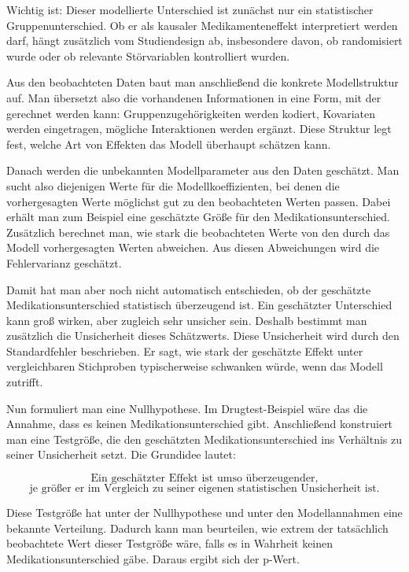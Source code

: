 \documentclass[10pt, letterpaper]{article}
\begin{document}
Wichtig ist: Dieser modellierte Unterschied ist zunächst nur ein statistischer Gruppenunterschied. Ob er als kausaler Medikamenteneffekt interpretiert werden darf, hängt zusätzlich vom Studiendesign ab, insbesondere davon, ob randomisiert wurde oder ob relevante Störvariablen kontrolliert wurden.

Aus den beobachteten Daten baut man anschließend die konkrete Modellstruktur auf. Man übersetzt also die vorhandenen Informationen in eine Form, mit der gerechnet werden kann: Gruppenzugehörigkeiten werden kodiert, Kovariaten werden eingetragen, mögliche Interaktionen werden ergänzt. Diese Struktur legt fest, welche Art von Effekten das Modell überhaupt schätzen kann.

Danach werden die unbekannten Modellparameter aus den Daten geschätzt. Man sucht also diejenigen Werte für die Modellkoeffizienten, bei denen die vorhergesagten Werte möglichst gut zu den beobachteten Werten passen. Dabei erhält man zum Beispiel eine geschätzte Größe für den Medikationsunterschied. Zusätzlich berechnet man, wie stark die beobachteten Werte von den durch das Modell vorhergesagten Werten abweichen. Aus diesen Abweichungen wird die Fehlervarianz geschätzt.

Damit hat man aber noch nicht automatisch entschieden, ob der geschätzte Medikationsunterschied statistisch überzeugend ist. Ein geschätzter Unterschied kann groß wirken, aber zugleich sehr unsicher sein. Deshalb bestimmt man zusätzlich die Unsicherheit dieses Schätzwerts. Diese Unsicherheit wird durch den Standardfehler beschrieben. Er sagt, wie stark der geschätzte Effekt unter vergleichbaren Stichproben typischerweise schwanken würde, wenn das Modell zutrifft.

Nun formuliert man eine Nullhypothese. Im Drugtest-Beispiel wäre das die Annahme, dass es keinen Medikationsunterschied gibt. Anschließend konstruiert man eine Testgröße, die den geschätzten Medikationsunterschied ins Verhältnis zu seiner Unsicherheit setzt. Die Grundidee lautet:

\[
\text{Ein geschätzter Effekt ist umso überzeugender,}
\]
\[
\text{je größer er im Vergleich zu seiner eigenen statistischen Unsicherheit ist.}
\]

Diese Testgröße hat unter der Nullhypothese und unter den Modellannahmen eine bekannte Verteilung. Dadurch kann man beurteilen, wie extrem der tatsächlich beobachtete Wert dieser Testgröße wäre, falls es in Wahrheit keinen Medikationsunterschied gäbe. Daraus ergibt sich der p-Wert.
\end{document}
